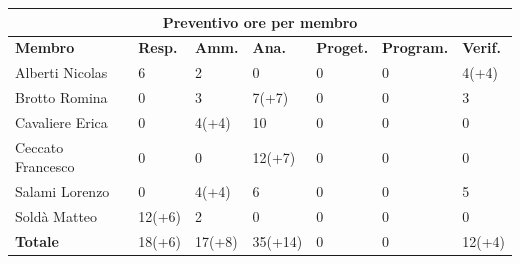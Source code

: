 \documentclass[a4paper, 12pt]{article}
\begin{document}
\begin{center}
	\begin{tabularx}{\textwidth}{|X|X|X|X|X|X|X|}
		\hline
		\multicolumn{7}{|c|}{\textbf{Preventivo ore per membro}}                                 \\
		\hline
		\hline
		\textbf{Membro}   & \textbf{Resp.}    & \textbf{Amm.}   & \textbf{Ana.} &
		\textbf{Proget.}  & \textbf{Program.} & \textbf{Verif.}                                  \\
		\hline
		Alberti Nicolas   & 6                 & 2               & 0             & 0 & 0 & 4(+4)  \\
		\hline
		Brotto Romina     & 0                 & 3               & 7(+7)         & 0 & 0 & 3      \\
		\hline
		Cavaliere Erica   & 0                 & 4(+4)           & 10            & 0 & 0 & 0      \\
		\hline
		Ceccato Francesco & 0                 & 0               & 12(+7)        & 0 & 0 & 0      \\
		\hline
		Salami Lorenzo    & 0                 & 4(+4)           & 6             & 0 & 0 & 5      \\
		\hline
		Soldà Matteo      & 12(+6)            & 2               & 0             & 0 & 0 & 0      \\
		\hline
		\hline
		\textbf{Totale}   & 18(+6)            & 17(+8)          & 35(+14)       & 0 & 0 & 12(+4) \\
		\hline
	\end{tabularx}\\[8pt]
	\mbox{}\\
\end{center}

\newpage
\end{document}
